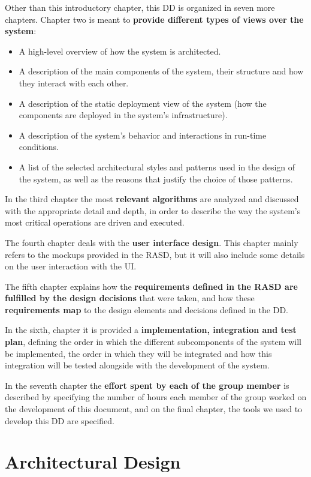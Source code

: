 \documentclass[12pt]{article}
\begin{document}
Other than this introductory chapter, this DD is organized in seven more chapters. Chapter two is meant to \textbf{provide different types of views over the system}:
\begin{itemize}
    \item A high-level overview of how the system is architected.
    \item A description of the main components of the system, their structure and how they interact with each other.
    \item A description of the static deployment view of the system (how the components are deployed in the system's infrastructure). 
    \item A description of the system's behavior and interactions in run-time conditions.
    \item A list of the selected architectural styles and patterns used in the design of the system, as well as the reasons that justify the choice of those patterns.
\end{itemize}

In the third chapter the most \textbf{relevant algorithms} are analyzed and discussed with the appropriate detail and depth, in order to describe the way the system's most critical operations are driven and executed.

The fourth chapter deals with the \textbf{user interface design}. This chapter mainly refers to the mockups provided in the RASD, but it will also include some details on the user interaction with the UI.

The fifth chapter explains how the \textbf{requirements defined in the RASD are fulfilled by the design decisions} that were taken, and how these \textbf{requirements map} to the design elements and decisions defined in the DD.

In the sixth, chapter it is provided a \textbf{implementation, integration and test plan}, defining the order in which the different subcomponents of the system will be implemented, the order in which they will be integrated and how this integration will be tested alongside with the development of the system.

In the seventh chapter the \textbf{effort spent by each of the group member} is described by specifying the number of hours each member of the group worked on the development of this document, and on the final chapter, the tools we used to develop this DD are specified.


\section{Architectural Design}
\end{document}
